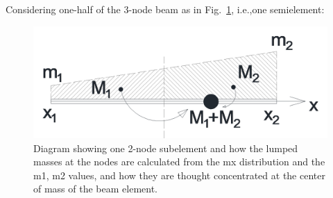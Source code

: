 \documentclass[report]{nrel}
\def\ie{i.e., }
\def\ie{i.e.,}
\begin{document}
Considering one-half of the 3-node beam as in Fig.~\ref{fig:beam3}, \ie one semielement:
%
\begin{figure}[!h]
	\centering
	\includegraphics[width=0.8\linewidth]{PICS/beam3}
	\caption{Diagram showing one 2-node subelement and how the lumped masses at the nodes are calculated from the \gls{mx} distribution and the \gls{m1}, \gls{m2} values, and how they are thought concentrated at the center of mass of the beam element.}
	\label{fig:beam3}
\end{figure}
%
\end{document}
